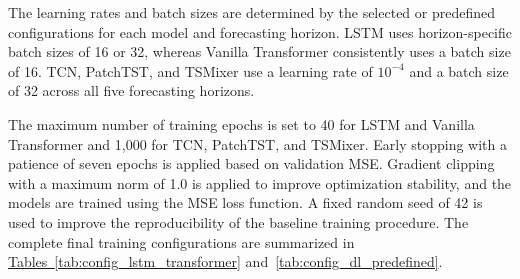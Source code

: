 \documentclass[12pt,twoside]{ord}
\begin{document}
The learning rates and batch sizes are determined by the selected or predefined configurations for each model and forecasting horizon. LSTM uses horizon-specific batch sizes of 16 or 32, whereas Vanilla Transformer consistently uses a batch size of 16. TCN, PatchTST, and TSMixer use a learning rate of $10^{-4}$ and a batch size of 32 across all five forecasting horizons.

The maximum number of training epochs is set to 40 for LSTM and Vanilla Transformer and 1,000 for TCN, PatchTST, and TSMixer. Early stopping with a patience of seven epochs is applied based on validation MSE. Gradient clipping with a maximum norm of 1.0 is applied to improve optimization stability, and the models are trained using the MSE loss function. A fixed random seed of 42 is used to improve the reproducibility of the baseline training procedure. The complete final training configurations are summarized in \hyperref[tab:config_lstm_transformer]{Tables~\ref*{tab:config_lstm_transformer}} and~\hyperref[tab:config_dl_predefined]{\ref*{tab:config_dl_predefined}}.
\end{document}
